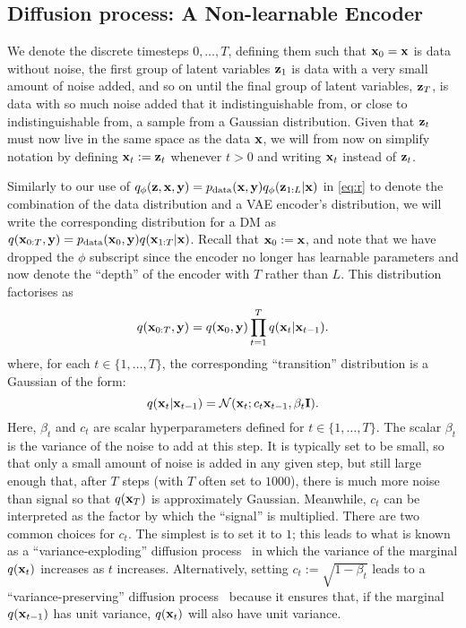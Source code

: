 \subsection{Diffusion process: A Non-learnable Encoder}
We denote the discrete timesteps $0,\ldots,T$, defining them such that ${\mathbf{x}}_0={\mathbf{x}}$ is data without noise, the first group of latent variables ${\mathbf{z}}_1$ is data with a very small amount of noise added, and so on until the final group of latent variables, ${\mathbf{z}}_T$, is data with so much noise added that it indistinguishable from, or close to indistinguishable from, a sample from a Gaussian distribution. Given that ${\mathbf{z}}_t$ must now live in the same space as the data ${\mathbf{x}}$, we will from now on simplify notation by defining ${\mathbf{x}}_t := {\mathbf{z}}_t$ whenever $t > 0$ and writing ${\mathbf{x}}_t$ instead of ${\mathbf{z}}_t$.

Similarly to our use of $q_\phi({\mathbf{z}}, {\mathbf{x}},{\mathbf{y}})=p_{\rm{data}}({\mathbf{x}},{\mathbf{y}})q_\phi({\mathbf{z}}_{1:L}|{\mathbf{x}})$ in \cref{eq:r} to denote the combination of the data distribution and a VAE encoder's distribution, we will write the corresponding distribution for a DM as $q({\mathbf{x}}_{0:T},{\mathbf{y}}) = p_{\rm{data}}({\mathbf{x}}_0,{\mathbf{y}}) q({\mathbf{x}}_{1:T}|{\mathbf{x}})$. Recall that ${\mathbf{x}}_0 := {\mathbf{x}}$, and note that we have dropped the $\phi$ subscript since the encoder no longer has learnable parameters and now denote the ``depth'' of the encoder with $T$ rather than $L$. This distribution factorises as 
\begin{equation} \label{eq:q-joint}
    q({\mathbf{x}}_{0:T}, {\mathbf{y}}) = q({\mathbf{x}}_0, {\mathbf{y}}) \prod_{t=1}^T q({\mathbf{x}}_t|{\mathbf{x}}_{t-1}).
\end{equation}
where, for each $t \in \{1, \ldots, T\}$, the corresponding ``transition'' distribution is a Gaussian of the form:
\begin{equation} \label{eq:q-step-general}
    q({\mathbf{x}}_t | {\mathbf{x}}_{t-1}) = {\mathcal{N}}({\mathbf{x}}_t ; c_t  {\mathbf{x}}_{t-1} , \beta_t {\mathbf{I}} ).
\end{equation}
Here, $\beta_t$ and $c_t$ are scalar hyperparameters defined for $t \in \{1, \ldots, T\}$. The scalar $\beta_t$ is the variance of the noise to add at this step. It is typically set to be small, so that only a small amount of noise is added in any given step, but still large enough that, after $T$ steps (with $T$ often set to $1000$), there is much more noise than signal so that $q({\mathbf{x}}_T)$ is approximately Gaussian. Meanwhile, $c_t$ can be interpreted as the factor by which the ``signal'' is multiplied. There are two common choices for $c_t$. The simplest is to set it to $1$; this leads to what is known as a ``variance-exploding'' diffusion process~\citep{song2020score} in which the variance of the marginal $q({\mathbf{x}}_t)$ increases as $t$ increases. Alternatively, setting $c_t := \sqrt{1-\beta_t}$ leads to a ``variance-preserving'' diffusion process~\citep{song2020score} because it ensures that, if the marginal $q({\mathbf{x}}_{t-1})$ has unit variance, $q({\mathbf{x}}_t)$ will also have unit variance.

